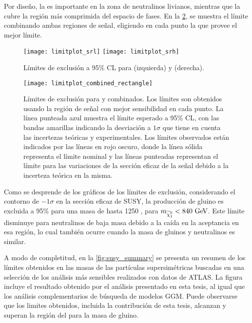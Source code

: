 Por diseño, la {\SRL} es importante en la zona de neutralinos livianos, mientras que
la {\SRH} cubre la región más comprimida del espacio de fases. En la
\cref{fig:limit_combined}, se muestra el límite combinando ambas
regiones de señal, eligiendo en cada punto la que provee el mejor límite.


\begin{figure}[!htb]
  \centering

  \texttt{[image: limitplot\_srl]}
  \texttt{[image: limitplot\_srh]}

  \caption{Límites de exclusión a 95\% CL para {\SRL}  (izquierda) y {\SRH} (derecha).}
  \label{fig:limit_srs}
\end{figure}


\begin{figure}[!htb]
  \centering

  \texttt{[image: limitplot\_combined\_rectangle]}

  \caption{Límites de exclusión para {\SRL} y {\SRH} combinados. Los límites
    son obtenidos usando la región de señal con mejor sensibilidad en cada punto.
    La línea punteada azul muestra el límite esperado a 95\% CL, con las bandas
    amarillas indicando la desviación a $1\sigma$ que tiene en cuenta las incertezas
    teóricas y experimentales. Los
    límites observados están indicados por las líneas en rojo oscuro, donde la línea
    sólida representa el límite nominal y las líneas punteadas representan el límite
    para las variaciones de la sección eficaz de la señal debido a la incerteza
    teórica en la misma.}
   \label{fig:limit_combined}

\end{figure}


Como se desprende de los gráficos de los límites de exclusión, considerando el
contorno de $-1\sigma$ en la sección eficaz de SUSY, la producción de gluino es
excluida a 95\% {\cl} para una masa de hasta 1250 \gev, para
$m_{\ninoone}<{840}\gev$. Este límite disminuye para neutralinos de baja masa
debido a la caída en la aceptancia en esa región, lo cual también ocurre cuando
la masa de gluinos y neutralinos es similar.

A modo de completitud, en la \cref{fig:susy_summary} se presenta un resumen de
los límites obtenidos en las masas de las partículas supersimétricas buscadas en
una selección de los análisis más sensibles realizados con datos de ATLAS. La
figura incluye el resultado obtenido por el análisis presentado en esta tesis,
al igual que los análisis complementarios de búsqueda de modelos GGM.
Puede observarse que los limites obtenidos, incluida la contribución de esta tesis,
alcanzan y superan la región del {\tev} para la masa de gluino.


